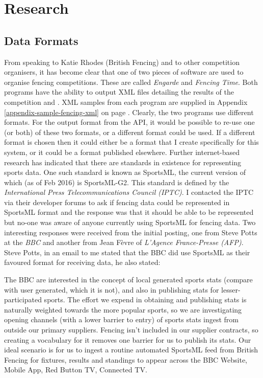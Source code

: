 \chapter{Research} \label{chapter:research}

\section{Data Formats}
From speaking to Katie Rhodes (British Fencing) and to other competition
organisers, it has become clear that one of two pieces of software are used to
organise fencing competitions. These are called \textit{Engarde} and
\textit{Fencing Time}. Both programs have the ability to output XML files
detailing the results of the competition \citep{engardewebsite} and
\citep{fencingtimewebsite}. XML samples from each program are supplied in
Appendix \ref{appendix-sample-fencing-xml} on page
\pageref{appendix-sample-fencing-xml}. Clearly, the two programs use different
formats.
For the output format from the API, it would be possible to re-use one
(or both) of these two formats, or a different format could be used. If a
different format is chosen then it could either be a format that I create
specifically for this system, or it could be a format published elsewhere.
Further internet-based research has indicated that there are standards in
existence for representing sports data. One such standard is known as SportsML,
the current version of which (as of Feb 2016) is SportsML-G2. This standard is
defined by the \textit{International Press Telecommunications Council (IPTC)}. I
contacted the IPTC via their developer forums to ask if fencing data could be
represented in SportsML format and the response was that it should be able to be
represented but no-one was aware of anyone currently using SportsML for fencing
data. Two interesting responses were received from the initial posting, one from
Steve Potts at the \textit{BBC} and another from Jean F\`{e}vre of
\textit{L'Agence France-Presse (AFP)}.\\
Steve Potts, in an email to me stated that the BBC did use SportsML as their
favoured format for receiving data, he also stated:
\begin{displayquote}
The BBC are interested in the concept of local generated
sports stats (compare with user generated, which it is not), and also in publishing stats for
lesser-participated sports. The effort we expend in obtaining and publishing
stats is naturally weighted towards the more popular sports, so we are
investigating opening channels (with a lower barrier to entry) of sports stats
ingest from outside our primary suppliers. Fencing isn't included in our
supplier contracts, so creating a vocabulary for it removes one barrier for us
to publish its stats. Our ideal scenario is for us to ingest a routine automated
SportsML feed from British Fencing for fixtures, results and standings to appear
across the BBC Website, Mobile App, Red Button TV, Connected TV.
\citep{pottsemail20160202}
\end{displayquote}
